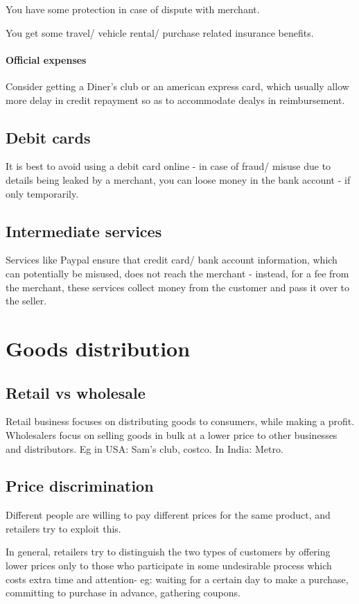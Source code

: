 \documentclass[oneside, article]{memoir}
\begin{document}
You have some protection in case of dispute with merchant.

You get some travel/ vehicle rental/ purchase related insurance benefits.

\subsubsection{Official expenses}
Consider getting a Diner's club or an american express card, which usually allow more delay in credit repayment so as to accommodate dealys in reimbursement.

\section{Debit cards}
It is best to avoid using a debit card online - in case of fraud/ misuse due to details being leaked by a merchant, you can loose money in the bank account - if only temporarily.

\section{Intermediate services}
Services like Paypal ensure that credit card/ bank account information, which can potentially be misused, does not reach the merchant - instead, for a fee from the merchant, these services collect money from the customer and pass it over to the seller.

\chapter{Goods distribution}
\section{Retail vs wholesale}
Retail business focuses on distributing goods to  consumers, while making a profit. Wholesalers focus on selling goods in bulk at a lower price to other businesses and distributors. Eg in USA: Sam's club, costco. In India: Metro.

\section{Price discrimination}
Different people are willing to pay different prices for the same product, and retailers try to exploit this.

In general, retailers try to distinguish the two types of customers by offering lower prices only to those who participate in some undesirable process which costs extra time and attention- eg: waiting for a certain day to make a purchase, committing to purchase in advance, gathering coupons.
\end{document}
